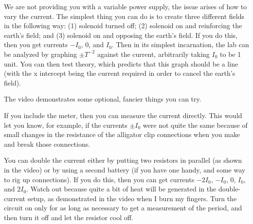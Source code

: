 We are not providing you with a variable power supply, the issue arises of how to vary the current.
The simplest thing you can do is to create three different fields in the following way: (1) solenoid turned off;
(2) solenoid on and reinforcing the earth's field; and (3) solenoid on and opposing the earth's field.
If you do this, then you get currents $-I_0$, 0, and $I_0$. Then in its simplest incarnation,
the lab can be analyzed by graphing $\pm T^{-2}$ against the current, arbitrarily taking $I_0$ to be 1 unit. You can then test theory, which
predicts that this graph should be a line (with the x intercept being the current required in order to
cancel the earth's field).

The video demonstrates some optional, fancier things you can try.

If you include the meter, then you can measure
the current directly. This would let you know, for example, if the currents $\pm I_0$ were not quite the same
because of small changes in the resistance of the alligator clip connections when you make and break those connections.

You can double the current either by putting two resistors in parallel (as shown in the video) or by
using a second battery (if you have one handy, and some way to rig up connections). 
If you do this, then you can get currents $-2I_0$, $-I_0$, 0, $I_0$, and $2I_0$.
Watch out because
quite a bit of heat will be generated in the double-current setup, as demonstrated in the video when I
burn my fingers. Turn the circuit on only for as long as necessary to get a measurement of the period,
and then turn it off and let the resistor cool off.





